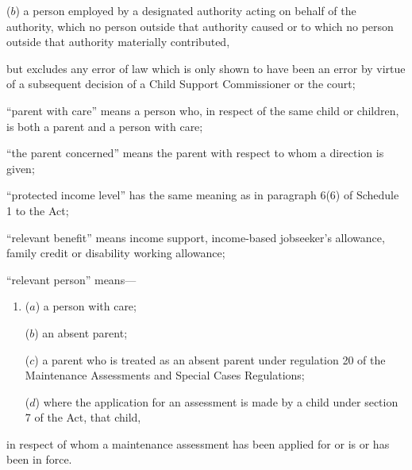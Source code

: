 \documentclass[a4paper,12pt]{article}
\begin{document}
\begin{enumerate}
\begin{enumerate}
($b$) a person employed by a designated authority acting on behalf of the authority, which no person outside that authority caused or to which no person outside that authority materially contributed,
\end{enumerate}
but excludes any error of law which is only shown to have been an error by virtue of a subsequent decision of a Child Support Commissioner or the court;

“parent with care” means a person who, in respect of the same child or children, is both a parent and a person with care;

“the parent concerned” means the parent with respect to whom a direction is given;

“protected income level” has the same meaning as in paragraph 6(6) of Schedule 1 to the Act;

“relevant benefit” means income support, 
income-based jobseeker’s allowance,  %
family credit or disability working allowance;

“relevant person” means—
\begin{enumerate}\item[]
($a$) a person with care;

($b$) an absent parent;

($c$) a parent who is treated as an absent parent under regulation 20 of the Maintenance Assessments and Special Cases Regulations;

($d$) where the application for an assessment is made by a child under section 7 of the Act, that child,
\end{enumerate}
in respect of whom a maintenance assessment has been applied for or is or has been in force.
\end{enumerate}
\end{document}
